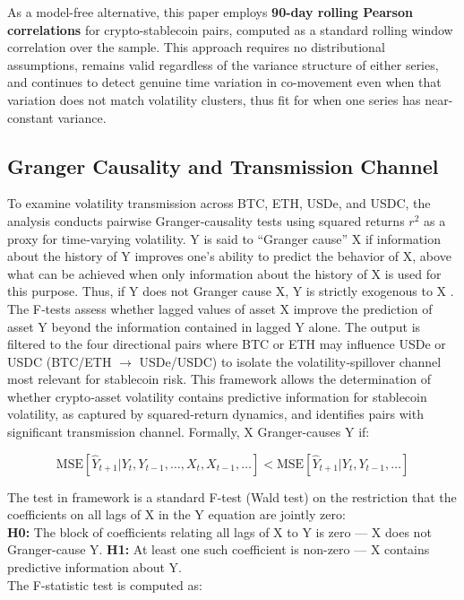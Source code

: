 \documentclass[12pt,a4paper,titlepage,oneside,english]{article}
\begin{document}
As a model-free alternative, this paper employs \textbf{90-day rolling Pearson correlations} for crypto-stablecoin pairs, computed as a standard rolling window correlation over the sample. This approach requires no distributional assumptions, remains valid regardless of the variance structure of either series, and continues to detect genuine time variation in co-movement even when that variation does not match volatility clusters, thus fit for when one series has near-constant variance.

\subsection{Granger Causality and Transmission Channel}
To examine volatility transmission across BTC, ETH, USDe, and USDC, the analysis conducts pairwise Granger‑causality tests using squared returns $r^2$ as a proxy for time‑varying volatility. Y is said to “Granger cause” X if information about the history of Y improves one's ability to predict the behavior of X, above what can be achieved when only information about the history of X is used for this purpose. Thus, if Y does not Granger cause X, Y is strictly exogenous to X \parencite{CLARKE2005829}\parencite{granger1969causality}. The F‑tests assess whether lagged values of asset X improve the prediction of asset Y beyond the information contained in lagged Y alone. The output is filtered to the four directional pairs where BTC or ETH may influence USDe or USDC (BTC/ETH $\rightarrow$ USDe/USDC) to isolate the volatility‑spillover channel most relevant for stablecoin risk. This framework allows the determination of whether crypto‑asset volatility contains predictive information for stablecoin volatility, as captured by squared‑return dynamics, and identifies pairs with significant transmission channel.
Formally, X Granger-causes Y if:

$$\text{MSE}[\hat{Y}_{t+1} | Y_{t}, Y_{t-1}, \ldots, X_t, X_{t-1}, \ldots] < \text{MSE}[\hat{Y}_{t+1} | Y_{t}, Y_{t-1}, \ldots]$$

The test in framework is a standard F-test (Wald test) on the restriction that the coefficients on all lags of X in the Y equation are jointly zero:\\
\textbf{H0:} The block of coefficients relating all lags of X to Y is zero — X does not Granger-cause Y.
\textbf{H1:} At least one such coefficient is non-zero — X contains predictive information about Y.\\
The F-statistic test is computed as:
\end{document}
